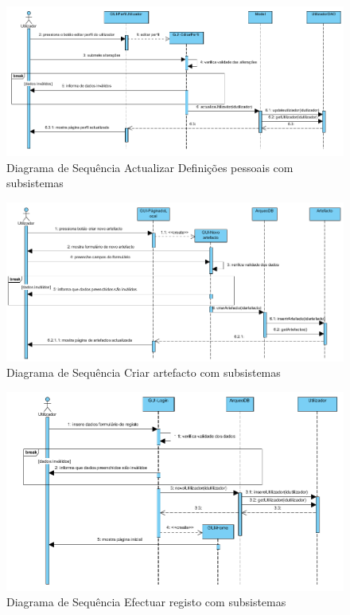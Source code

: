 ﻿\documentclass[12pt,a4paper]{article}
\begin{document}
\begin{figure}[h!]
\centering
\includegraphics[scale=0.7]{sequencia/est_actualizardef}
\caption{Diagrama de Sequência Actualizar Definições pessoais com subsistemas} 
\end{figure} 

\begin{figure}[h!]
\centering
\includegraphics[scale=0.7]{sequencia/est_criarartefacto}
\caption{Diagrama de Sequência Criar artefacto com subsistemas} 
\end{figure}   

\begin{figure}[h!]
\centering
\includegraphics[scale=0.7]{sequencia/est_registo}
\caption{Diagrama de Sequência Efectuar registo com subsistemas} 
\end{figure}  
\end{document}
